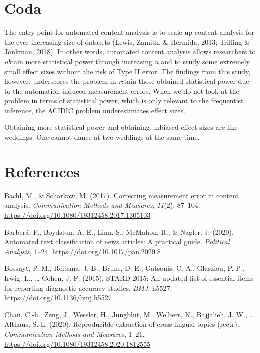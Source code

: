 \documentclass[english,man,floatsintext]{apa6}
\begin{document}
\hypertarget{coda}{%
\section{Coda}\label{coda}}

The entry point for automated content analysis is to scale up content analysis for the ever-increasing size of datasets (Lewis, Zamith, \& Hermida, 2013; Trilling \& Jonkman, 2018). In other words, automated content analysis allows researchers to \emph{ob}tain more statistical power through increasing \emph{n} and to study some extremely small effect sizes without the risk of Type II error. The findings from this study, however, underscores the problem in \emph{re}tain those obtained statistical power due to the automation-induced measurement errors. When we do not look at the problem in terms of statistical power, which is only relevant to the frequentist inference, the ACIDIC problem underestimates effect sizes.

Obtaining more statistical power and obtaining unbiased effect sizes are like weddings. One cannot dance at two weddings at the same time.

\hypertarget{references}{%
\section{References}\label{references}}

\begingroup
\setlength{\parindent}{-0.5in}
\setlength{\leftskip}{0.5in}

\hypertarget{refs}{}
\leavevmode\hypertarget{ref-bachl:2017:CME}{}%
Bachl, M., \& Scharkow, M. (2017). Correcting measurement error in content analysis. \emph{Communication Methods and Measures}, \emph{11}(2), 87--104. \url{https://doi.org/10.1080/19312458.2017.1305103}

\leavevmode\hypertarget{ref-barberuxe1:2020:atc}{}%
Barberá, P., Boydstun, A. E., Linn, S., McMahon, R., \& Nagler, J. (2020). Automated text classification of news articles: A practical guide. \emph{Political Analysis}, 1--24. \url{https://doi.org/10.1017/pan.2020.8}

\leavevmode\hypertarget{ref-bossuyt:2015:S}{}%
Bossuyt, P. M., Reitsma, J. B., Bruns, D. E., Gatsonis, C. A., Glasziou, P. P., Irwig, L., \ldots{} Cohen, J. F. (2015). STARD 2015: An updated list of essential items for reporting diagnostic accuracy studies. \emph{BMJ}, h5527. \url{https://doi.org/10.1136/bmj.h5527}

\leavevmode\hypertarget{ref-chan:2020:REC}{}%
Chan, C.-h., Zeng, J., Wessler, H., Jungblut, M., Welbers, K., Bajjalieh, J. W., \ldots{} Althaus, S. L. (2020). Reproducible extraction of cross-lingual topics (rectr). \emph{Communication Methods and Measures}, 1--21. \url{https://doi.org/10.1080/19312458.2020.1812555}
\end{document}
